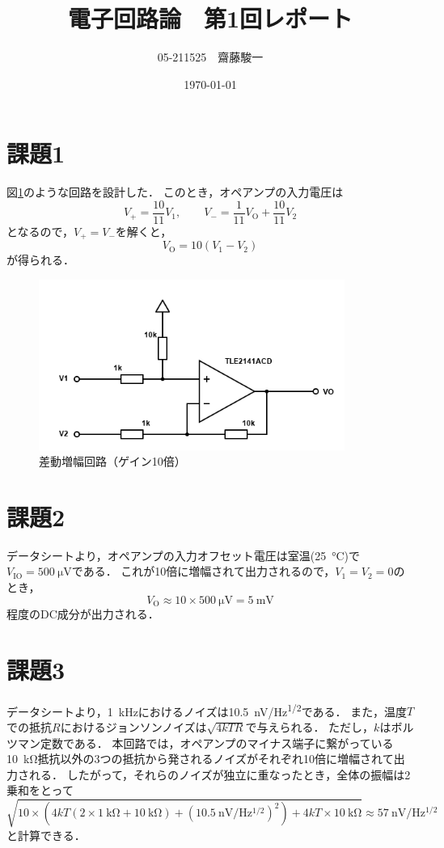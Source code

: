 \documentclass[a4paper,11pt]{jsarticle}
\begin{document}
\title{電子回路論　第1回レポート}
\author{05-211525　齋藤駿一}
\date{\today}
\maketitle

\section*{課題1}
図\ref{fig:1}のような回路を設計した．
このとき，オペアンプの入力電圧は
\begin{equation}
  V_{+} = \frac{10}{11}V_1, \qquad V_{-} = \frac{1}{11}V_{\mathrm{O}} + \frac{10}{11}V_2
\end{equation}
となるので，$V_{+}=V_{-}$を解くと，
\begin{equation}
  V_{\mathrm{O}} = 10(V_1 - V_2)
\end{equation}
が得られる．

\begin{figure}[htbp]
  \centering
  \includegraphics[width=10cm]{schemeit-project.png}
  \caption{差動増幅回路（ゲイン10倍）}
  \label{fig:1}
\end{figure}

\section*{課題2}

データシートより，オペアンプの入力オフセット電圧は室温(\SI{25}{\degreeCelsius})で$V_{\mathrm{IO}}=\SI{500}{\micro\V}$である．
これが10倍に増幅されて出力されるので，$V_1=V_2=0$のとき，
\begin{equation}
  V_{\mathrm{O}} \approx 10\times \SI{500}{\micro\V} = \SI{5}{\mV}
\end{equation}
程度のDC成分が出力される．

\section*{課題3}

データシートより，\SI{1}{\kHz}におけるノイズは\SI{10.5}{\nV/\Hz^{1/2}}である．
また，温度$T$での抵抗$R$におけるジョンソンノイズは$\sqrt{4kTR}$で与えられる．
ただし，$k$はボルツマン定数である．
本回路では，オペアンプのマイナス端子に繋がっている\SI{10}{\kohm}抵抗以外の3つの抵抗から発されるノイズがそれぞれ10倍に増幅されて出力される．
したがって，それらのノイズが独立に重なったとき，全体の振幅は2乗和をとって
\begin{equation}
  \sqrt{10\times (4kT(2\times\SI{1}{\kohm}+\SI{10}{\kohm}) + (\SI{10.5}{\nV/\Hz^{1/2}})^2) + 4kT\times\SI{10}{\kohm}} \approx \SI{57}{\nV/\Hz^{1/2}}
\end{equation}
と計算できる．
\end{document}
